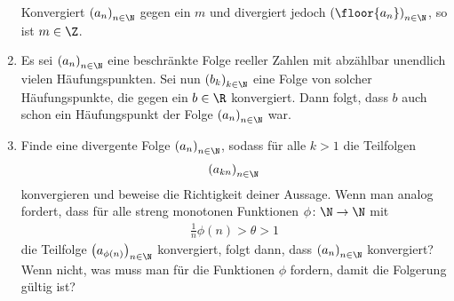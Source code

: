 \begin{prob}
\begin{enumerate}[label=(\alph*)]
    Konvergiert $\left( a_n \right)_{n \in \N}$ gegen ein $m$ und divergiert
    jedoch $\left( \floor{a_n} \right)_{n \in \N}$, so ist $m \in \Z$.
  \item Es sei $\left( a_n \right)_{n \in \N}$ eine beschränkte Folge reeller
    Zahlen mit abzählbar unendlich vielen Häufungspunkten. Sei nun
    $\left( b_k \right)_{k \in \N}$ eine Folge von solcher Häufungspunkte, die
    gegen ein $b \in \R$ konvergiert. Dann folgt, dass $b$ auch schon ein
    Häufungspunkt der Folge $\left( a_n \right)_{n \in \N}$ war.
  \item Finde eine divergente Folge $\left( a_n \right)_{n \in \N}$, sodass für
    alle $k > 1$ die Teilfolgen
    \begin{equation*}
      \begin{split}
        \left( a_{kn} \right)_{n \in \N}
      \end{split}
    \end{equation*}
    konvergieren und beweise die Richtigkeit deiner Aussage. Wenn man analog
    fordert, dass für alle streng monotonen Funktionen $\phi \colon \N \to \N$
    mit
    \begin{equation*}
      \begin{split}
        \frac{1}{n} \phi(n) > \theta > 1
      \end{split}
    \end{equation*}
    die Teilfolge $\left( a_{\phi(n)} \right)_{n \in \N}$ konvergiert, folgt
    dann, dass $\left( a_n \right)_{n \in \N}$ konvergiert? Wenn nicht, was muss
    man für die Funktionen $\phi$ fordern, damit die Folgerung gültig ist?
  \end{enumerate}
\end{prob}
